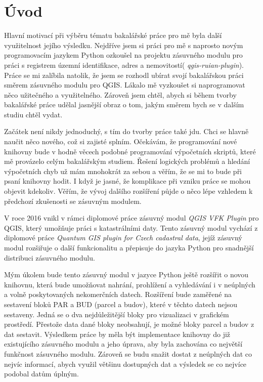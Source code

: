 \chapter{Úvod}
\label{1-uvod}
Hlavní motivací při výběru tématu bakalářské práce pro mě byla další využitelnost jejího výsledku. Nejdříve jsem si práci pro mě s naprosto novým programovacím jazykem Python ozkoušel na projektu zásuvného modulu pro práci s registrem územní identifikace, adres a nemovitostí( \textit{qgis-ruian-plugin}). Práce se mi zalíbila natolik, že jsem se rozhodl ubírat svojí bakalářskou práci směrem zásuvného modulu pro QGIS. Lákalo mě vyzkoušet si naprogramovat něco užitečného a využitelného. Zároveň jsem chtěl, abych si během tvorby bakalářské práce udělal jasnější obraz o tom, jakým směrem bych se v dalším studiu chtěl vydat.

Začátek není nikdy jednoduchý, s tím do tvorby práce také jdu. Chci se hlavně naučit něco nového, což si zajisté splním. Očekávám, že programování nové knihovny bude v hodně věcech podobné programování výpočetních skriptů, které mě provázelo celým bakalářským studiem. Řešení logických problémů a hledání výpočetních chyb už mám mnohokrát za sebou a věřím, že se mi to bude při psaní knihovny hodit. I když je jasné, že komplikace při vzniku práce se mohou objevit kdekoliv. Věřím, že vývoj dalšího rozšíření půjde o něco lépe vzhledem k předchozí zkušenosti se zásuvným modulem.

V roce 2016 vnikl v rámci diplomové práce zásuvný modul \textit{QGIS VFK Plugin} pro QGIS, který umožňuje práci s katastrálními daty. Tento zásuvný modul vychází z diplomové práce \textit{Quantum GIS plugin for Czech cadastral data}, jejíž zásuvný modul rozšiřuje o další funkcionalitu a přepisuje do jazyka Python pro snadnější distribuci zásuvného modulu.

Mým úkolem bude tento zásuvný modul v jazyce Python ještě rozšířit o novou knihovnu, která bude umožňovat nahrání, prohlížení a vyhledávání i v neúplných a volně poskytovaných nekomerčních datech. Rozšíření bude zaměřené na sestavení bloků PAR a BUD (parcel a budov), které v těchto datech nejsou sestaveny. Jedná se o dva nejdůležitější bloky pro vizualizaci v grafickém prostředí. Přestože data dané bloky neobsahují, je možné bloky parcel a budov z dat sestavit. Výsledkem práce by měla být implementace knihovny do již existujícího zásuvného modulu a jeho úprava, aby byla zachována co největší funkčnost zásuvného modulu. Zároveň se budu snažit dostat z neúplných dat co nejvíc informací, abych využil většinu dostupných dat a výsledek se co nejvíce podobal datům úplným.

